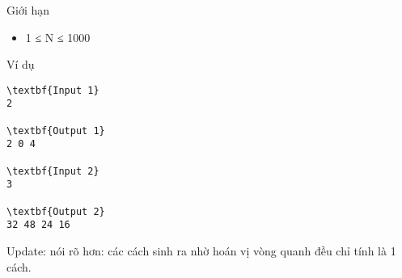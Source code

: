 Giới hạn
\begin{itemize}
	\item 1 ≤ N ≤ 1000
\end{itemize}
Ví dụ
\begin{verbatim}
\textbf{Input 1}
2

\textbf{Output 1}
2 0 4

\textbf{Input 2}
3

\textbf{Output 2}
32 48 24 16 \end{verbatim}




Update: nói rõ hơn: các cách sinh ra nhờ hoán vị vòng quanh đều chỉ tính là 1 cách.